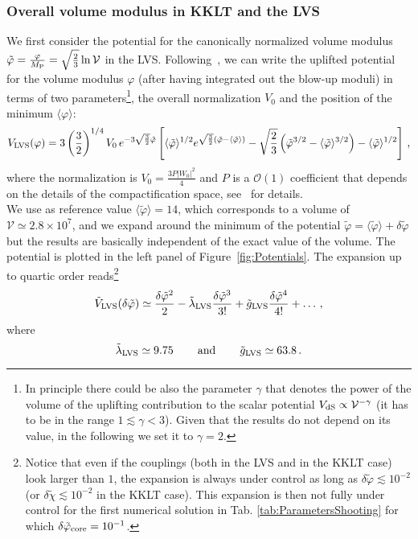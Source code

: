 \documentclass[11pt,a4paper]{article}
\newcommand{\V}{\mathcal{V}}
\begin{document}
\subsubsection{Overall volume modulus in KKLT and the LVS}

We first consider the potential for the canonically normalized volume modulus $\tilde\varphi = \frac{\varphi}{M_{\rm P}} = \sqrt{\frac{2}{3}} \ln \V$ in the LVS. Following~\cite{Cicoli:2016olq}, we can write the uplifted potential for the volume modulus $\varphi$ (after having integrated out the blow-up moduli) in terms of two parameters\footnote{In principle there could be also the parameter $\gamma$ that denotes the power of the volume of the uplifting contribution to the scalar potential $V_{\rm dS} \propto \V^{-\gamma}$ (it has to be in the range $1 \lesssim \gamma < 3$). Given that the results do not depend on its value, in the following we set it to $\gamma = 2$.}, the overall normalization $V_0$ and the position of the minimum $\langle\varphi\rangle:$ 
\begin{equation}
V_{\rm LVS}(\varphi) = 3 \left(\frac{3}{2}\right)^{1/4} V_0\, e^{-3 \sqrt{\frac{3}{2}} \tilde{\varphi}} \left[\langle\tilde{\varphi}\rangle^{1/2} e^{\sqrt{\frac{3}{2}} \left(\tilde{\varphi} - \langle\tilde{\varphi}\rangle\right)} - \sqrt{\frac{2}{3}} \left(\tilde{\varphi}^{3/2} - \langle\tilde{\varphi}\rangle^{3/2}\right) - \langle\tilde{\varphi}\rangle^{1/2}\right]\,,
\end{equation}
where the normalization is $V_0 = \frac{3 P |W_0|^2}{4}$ and $P$ is a $\mathcal{O}(1)$ coefficient that depends on the details of the compactification space, see~\cite{Cicoli:2016olq} for details.\\

We use as reference value $\langle\tilde{\varphi}\rangle = 14$, which corresponds to a volume of $\V \simeq 2.8 \times 10^7$, and we expand around the minimum of the potential $\tilde{\varphi} = \langle\tilde{\varphi}\rangle + \delta\tilde{\varphi}$ but the results are basically independent of the exact value of the volume. The potential is plotted in the left panel of Figure~\ref{fig:Potentials}. The expansion up to quartic order reads\footnote{Notice that even if the couplings (both in the LVS and in the KKLT case) look larger than $1$, the expansion is always under control as long as $\delta \tilde{\varphi} \lesssim 10^{-2}$ (or $\delta \tilde\chi \lesssim 10^{-2}$ in the KKLT case). This expansion is then not fully under control for the first numerical solution in Tab. \ref{tab:ParametersShooting} for which $\delta\tilde\varphi_{\rm core} = 10^{-1}$.}
\begin{equation}
\label{eq:LVSPotential}
\tilde{V}_{\rm LVS}(\delta\tilde\varphi) \simeq \frac{\delta\tilde\varphi^2}{2} - \tilde{\lambda}_{\rm LVS} \frac{\delta\tilde\varphi^3}{3!} + \tilde{g}_{\rm LVS}\frac{\delta\tilde\varphi^4}{4!} + \dots \,,
\end{equation}
where
\begin{equation}
\label{eq:LVSCoefficients}
\tilde{\lambda}_{\rm LVS} \simeq 9.75 \, \qquad \text{and} \, \qquad \tilde{g}_{\rm LVS} \simeq 63.8\,.
\end{equation}
\end{document}
